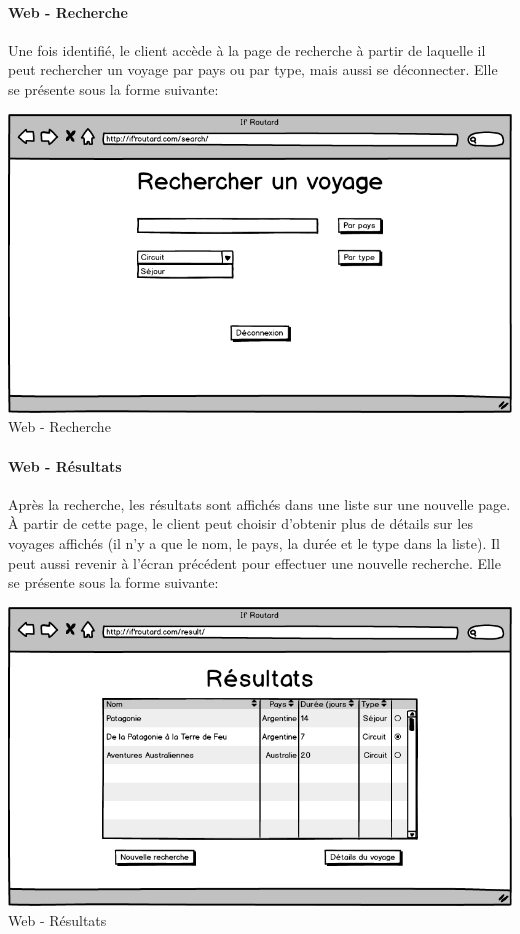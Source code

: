 \documentclass[11pt]{article}
\begin{document}
\paragraph{Web - Recherche}
Une fois identifié, le client accède à la page de recherche à partir de laquelle il peut rechercher un voyage par pays ou par type, mais aussi se déconnecter. Elle se présente sous la forme suivante:
\begin{center}
\includegraphics[scale = 0.4]{../Conception_graphique/png_Pour_CR/Web-20-Recherche.png}
\newline
Web - Recherche
\label{fig:Recherche}
\end{center}

\paragraph{Web - Résultats}
Après la recherche, les résultats sont affichés dans une liste sur une nouvelle page. À partir de cette page, le client peut choisir d'obtenir plus de détails sur les voyages affichés (il n'y a que le nom, le pays, la durée et le type dans la liste). Il peut aussi revenir à l'écran précédent pour effectuer une nouvelle recherche. Elle se présente sous la forme suivante:
\begin{center}
\includegraphics[scale = 0.4]{../Conception_graphique/png_Pour_CR/Web-30-Resultats.png}
\newline
Web - Résultats
\label{fig:Resultat}
\end{center}
\end{document}
